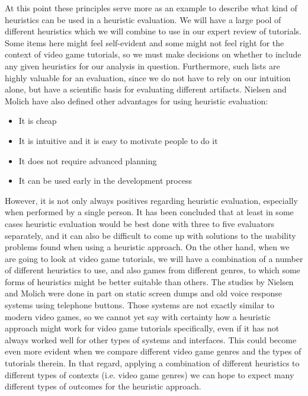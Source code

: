 At this point these principles serve more as an example to describe what kind of heuristics can be used in a heuristic evaluation. We will have a large pool of different heuristics which we will combine to use in our expert review of tutorials. Some items here might feel self-evident and some might not feel right for the context of video game tutorials, so we must make decisions on whether to include any given heuristics for our analysis in question. Furthermore, such lists are highly valuable for an evaluation, since we do not have to rely on our intuition alone, but have a scientific basis for evaluating different artifacts. Nielsen and Molich have also defined other advantages for using heuristic evaluation: \cite{Nielsen1990}

\begin{itemize}
	\item It is cheap
	\item It is intuitive and it is easy to motivate people to do it
	\item It does not require advanced planning
	\item It can be used early in the development process
\end{itemize}

However, it is not only always positives regarding heuristic evaluation, especially when performed by a single person. It has been concluded that at least in some cases heuristic evaluation would be best done with three to five evaluators separately, and it can also be difficult to come up with solutions to the usability problems found when using a heuristic approach. \cite{Nielsen1990} On the other hand, when we are going to look at video game tutorials, we will have a combination of a number of different heuristics to use, and also games from different genres, to which some forms of heuristics might be better suitable than others. The studies by Nielsen and Molich were done in part on static screen dumps and old voice response systems using telephone buttons. Those systems are not exactly similar to modern video games, so we cannot yet say with certainty how a heuristic approach might work for video game tutorials specifically, even if it has not always worked well for other types of systems and interfaces. This could become even more evident when we compare different video game genres and the types of tutorials therein. In that regard, applying a combination of different heuristics to different types of contexts (i.e. video game genres) we can hope to expect many different types of outcomes for the heuristic approach.

